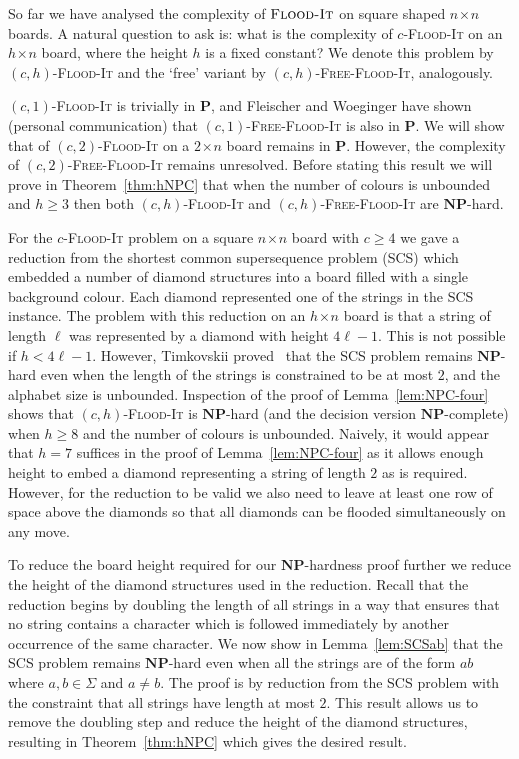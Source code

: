 \documentclass[a4paper,11pt]{llncs}
\newcounter{l}
\renewcommand{\geq}{\geqslant}
\newcommand{\Ptime}{\ensuremath{\mathbf{P}}}
\newcommand{\NPtime}{\ensuremath{\mathbf{NP}}}
\newcommand{\Coloroid}[1]{$#1$-\textsc{Flood-It}}
\newcommand{\ColoroidFree}[1]{$#1$-\textsc{Free-Flood-It}}
\newcommand{\Floodit}{\textsc{Flood-It}}
\newcommand{\SCS}{\textsc{SCS}}
\newcommand{\recdim}[2]{$#1$$\mspace{1mu}$$\times$$\mspace{1mu}$$#2$}
\begin{document}
So far we have analysed the complexity of $\Floodit$ on square shaped \recdim{n}{n} boards. A natural question to ask is: what is the complexity of \Coloroid{c} on an \recdim{h}{n} board, where the height $h$ is a fixed constant? We denote this problem by \Coloroid{(c,h)} and the `free' variant by \ColoroidFree{(c,h)}, analogously.

\Coloroid{(c,1)} is trivially in \Ptime, and Fleischer and Woeginger have shown (personal communication) that \ColoroidFree{(c,1)} is also in \Ptime. We will show that of \Coloroid{(c,2)} on a \recdim{2}{n} board remains in \Ptime. However, the complexity of \ColoroidFree{(c,2)} remains unresolved. Before stating this result we will prove in Theorem~\ref{thm:hNPC} that when the number of colours is unbounded and $h\geq 3$ then both \Coloroid{(c,h)} and \ColoroidFree{(c,h)} are \NPtime-hard.



For the \Coloroid{c} problem on a square \recdim{n}{n} board with $c \geq 4$ we gave a reduction from the shortest common supersequence problem (\SCS{}) which embedded a number of diamond structures into a board filled with a single background colour. Each diamond represented one of the strings in the \SCS{} instance. The problem with this reduction on an \recdim{h}{n} board is that a string of length $\ell$ was represented by a diamond with height $4\ell-1$. This is not possible if $h<4\ell-1$. However, Timkovskii proved~\cite{Timkovskii:1989} that the \SCS{} problem remains \NPtime-hard even when the length of the strings is constrained to be at most $2$, and the alphabet size is unbounded. Inspection of the proof of Lemma~\ref{lem:NPC-four} shows that \Coloroid{(c,h)} is \NPtime-hard (and the decision version \NPtime-complete) when $h \geq 8$ and the number of colours is unbounded. Naively, it would appear that $h=7$ suffices in the proof of Lemma~\ref{lem:NPC-four} as it allows enough height to embed a diamond representing a string of length $2$ as is required. However, for the reduction to be valid we also need to leave at least one row of space above the diamonds so that all diamonds can be flooded simultaneously on any move.

To reduce the board height required for our \NPtime-hardness proof further we reduce the height of the diamond structures used in the reduction. Recall that the reduction begins by doubling the length of all strings in a way that ensures that no string contains a character which is followed immediately by another occurrence of the same character. We now show in Lemma~\ref{lem:SCSab} that the \SCS{} problem remains \NPtime-hard even when all the strings are of the form $ab$ where $a,b \in \Sigma$ and $a \neq b$. The proof is by reduction from the \SCS{} problem with the constraint that all strings have length at most $2$. This result allows us to remove the doubling step and reduce the height of the diamond structures, resulting in Theorem~\ref{thm:hNPC} which gives the desired result.
\end{document}
